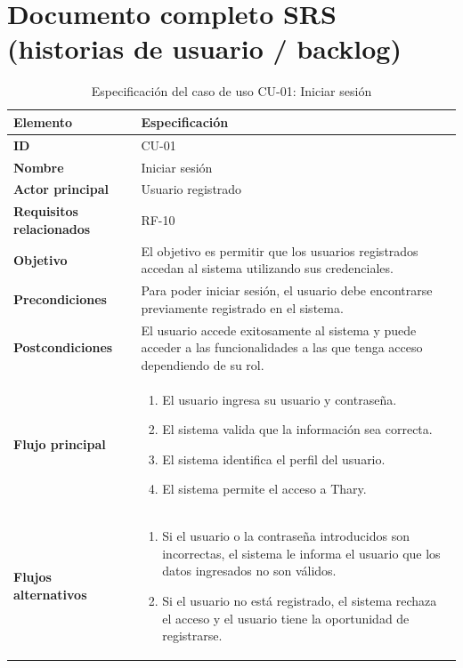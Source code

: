 \section{Documento completo SRS (historias de usuario / backlog)}
\begin{table}[H]
\centering
\caption{Especificación del caso de uso CU-01: Iniciar sesión}
\label{tab:cu01_login}
\renewcommand{\arraystretch}{1.3}
\begin{tabularx}{\textwidth}{|>{\bfseries}p{3.5cm}|X|}
\hline
Elemento & Especificación \\
\hline
ID & CU-01 \\
\hline
Nombre & Iniciar sesión \\
\hline
Actor principal & Usuario registrado \\
\hline
Requisitos relacionados & RF-10 \\
\hline
Objetivo & El objetivo es permitir que los usuarios registrados accedan al sistema utilizando sus credenciales. \\
\hline
Precondiciones & Para poder iniciar sesión, el usuario debe encontrarse previamente registrado en el sistema. \\
\hline
Postcondiciones & El usuario accede exitosamente al sistema y puede acceder a las funcionalidades a las que tenga acceso dependiendo de su rol. \\
\hline
Flujo principal &
\begin{enumerate}
    \item El usuario ingresa su usuario y contraseña.
    \item El sistema valida que la información sea correcta.
    \item El sistema identifica el perfil del usuario.
    \item El sistema permite el acceso a Thary.
\end{enumerate} \\
\hline
Flujos alternativos &
\begin{enumerate}
    \item Si el usuario o la contraseña introducidos son incorrectas, el sistema le informa el usuario que los datos ingresados no son válidos.
    \item Si el usuario no está registrado, el sistema rechaza el acceso y el usuario tiene la oportunidad de registrarse.
\end{enumerate} \\
\hline
\end{tabularx}
\end{table}


